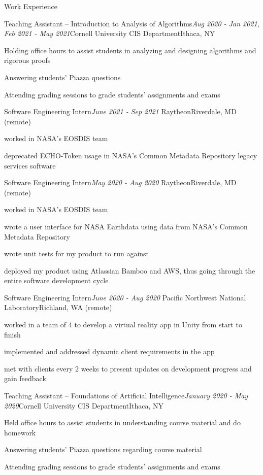 \documentclass{resume} %
\begin{document}
\begin{rSection}{Work Experience}

\begin{rSubsection}{Teaching Assistant -- Introduction to Analysis of Algorithms}{\em Aug 2020 - Jan 2021, Feb 2021 - May 2021}{Cornell University CIS Department}{Ithaca, NY}
\item Holding office hours to assist students in analyzing and designing algorithms and rigorous proofs
\item Answering students' Piazza questions
\item Attending grading sessions to grade students' assignments and exams
\end{rSubsection}

\begin{rSubsection}{Software Engineering Intern}{\em June 2021 - Sep 2021 }{Raytheon}{Riverdale, MD (remote)}
\item worked in NASA's EOSDIS team
\item deprecated ECHO-Token usage in NASA's Common Metadata Repository legacy services software
\end{rSubsection}

\begin{rSubsection}{Software Engineering Intern}{\em May 2020 - Aug 2020 }{Raytheon}{Riverdale, MD (remote)}
\item worked in NASA's EOSDIS team
\item wrote a user interface for NASA Earthdata using data from NASA's Common Metadata Repository
\item wrote unit tests for my product to run against
\item deployed my product using Atlassian Bamboo and AWS, thus going through the entire software development cycle
\end{rSubsection}

\begin{rSubsection}{Software Engineering Intern}{\em June 2020 - Aug 2020 }{Pacific Northwest National Laboratory}{Richland, WA (remote)}
\item worked in a team of 4 to develop a virtual reality app in Unity from start to finish
\item implemented and addressed dynamic client requirements in the app
\item met with clients every 2 weeks to present updates on development progress and gain feedback
\end{rSubsection}

\begin{rSubsection}{Teaching Assistant -- Foundations of Artificial Intelligence}{\em January 2020 - May 2020}{Cornell University CIS Department}{Ithaca, NY}
\item Held office hours to assist students in understanding course material and do homework
\item Answering students' Piazza questions regarding course material
\item Attending grading sessions to grade students' assignments and exams
\end{rSubsection}

\end{rSection}
\end{document}
